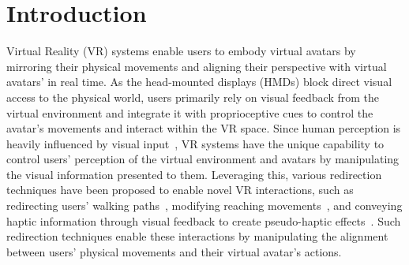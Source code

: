 \section{Introduction}
\label{section:introduction}

Virtual Reality (VR) systems enable users to embody virtual avatars by mirroring their physical movements and aligning their perspective with virtual avatars' in real time. 
As the head-mounted displays (HMDs) block direct visual access to the physical world, users primarily rely on visual feedback from the virtual environment and integrate it with proprioceptive cues to control the avatar’s movements and interact within the VR space.
Since human perception is heavily influenced by visual input~\cite{gibson1933adaptation}, 
VR systems have the unique capability to control users' perception of the virtual environment and avatars by manipulating the visual information presented to them.
Leveraging this, various redirection techniques have been proposed to enable novel VR interactions, 
such as redirecting users' walking paths~\cite{razzaque2005redirected, suma2012impossible, steinicke2009estimation},
modifying reaching movements~\cite{gonzalez2022model, azmandian2016haptic, cheng2017sparse, feick2021visuo},
and conveying haptic information through visual feedback to create pseudo-haptic effects~\cite{samad2019pseudo, dominjon2005influence, lecuyer2009simulating}.
Such redirection techniques enable these interactions by manipulating the alignment between users' physical movements and their virtual avatar's actions.


